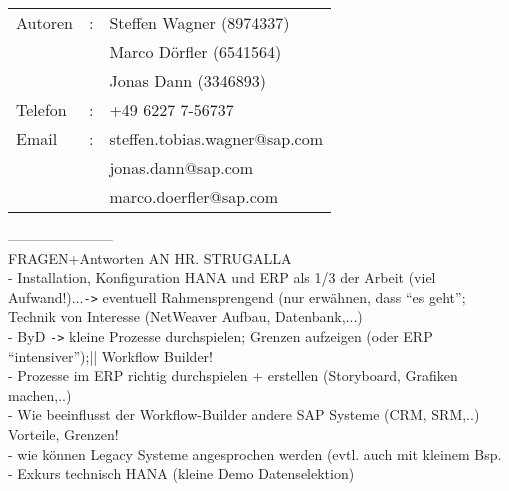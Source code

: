 \label{chap:Zusammenfassun}

\begin{tabular}{lll}
Autoren	&:& Steffen Wagner (8974337) \\
&& Marco Dörfler (6541564) \\
&& Jonas Dann (3346893) \\
Telefon	&:& +49 6227 7-56737 \\
Email	&:& steffen.tobias.wagner@sap.com \\
&& jonas.dann@sap.com\\
&& marco.doerfler@sap.com\\
\end{tabular}

\vspace*{3em}

-----------------------\\
\large{FRAGEN+Antworten AN HR. STRUGALLA}\\
- Installation, Konfiguration HANA und ERP als 1/3 der Arbeit (viel Aufwand!)...\verb|->| eventuell Rahmensprengend (nur erwähnen, dass "`es geht"'; Technik von Interesse (NetWeaver Aufbau, Datenbank,...)\\
- ByD \verb|->| kleine Prozesse durchspielen; Grenzen aufzeigen (oder ERP "`intensiver"');|| Workflow Builder!\\
- Prozesse im ERP richtig durchspielen + erstellen (Storyboard, Grafiken machen,..)\\ 
- Wie beeinflusst der Workflow-Builder andere SAP Systeme (CRM, SRM,..) Vorteile, Grenzen!\\
- wie können Legacy Systeme angesprochen werden (evtl. auch mit kleinem Bsp.\\
- Exkurs technisch HANA (kleine Demo Datenselektion)\\

